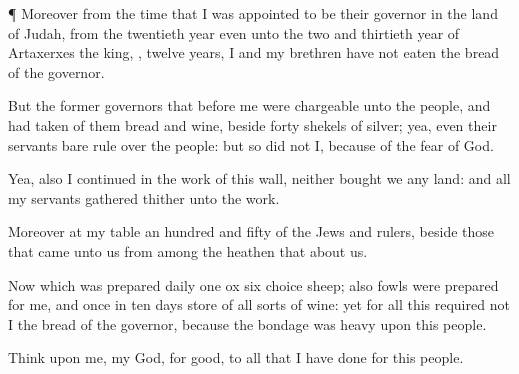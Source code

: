 {\par }{\PP {}¶ Moreover from the
time that I was
appointed to be their
governor in the
land of
Judah, from the
twentieth
year even unto the
two and
thirtieth
year of
Artaxerxes the
king,
{},
twelve
years, I and my
brethren have not
eaten the
bread of the
governor.

But the
former
governors that
{}
before me were
chargeable unto the
people, and had
taken of them
bread and
wine,
beside
forty
shekels of
silver; yea,
even their
servants bare
rule over the
people: but so
did not I,
because of the
fear of
God.

Yea, also I
continued in the
work of this
wall, neither
bought we any
land: and all my
servants
{}
gathered thither unto the
work.

Moreover
{} at my
table an
hundred and
fifty of the
Jews and
rulers, beside those that
came unto us from among the
heathen that
{} about
us.

Now
{} which was
prepared
{}
daily
{}
one
ox
{}
six
choice
sheep; also
fowls were
prepared for me, and once in
ten
days
store of all sorts of
wine: yet for
all this
required not I the
bread of the
governor, because the
bondage was
heavy upon this
people.

Think upon me, my
God, for
good,
{} to all that I have
done for this
people.




\par }
